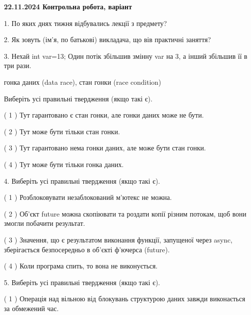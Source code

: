 \documentclass[12pt, ukrainian]{article}
\begin{document}
\vspace{4mm}
\newpage
\begin {large}

\textbf{22.11.2024 Контрольна робота, варіант  }\par


{
1. По яких днях тижня відбувались лекції з предмету?



\vspace{5mm}
2. Як зовуть (ім'я, по батькові) викладача, що вів практичні заняття?



\vspace{5mm}
3. Нехай int var=13; Один потік збільшив змінну var на 3, а інший збільшив її в три рази.

гонка даних (data race), стан гонки (race condition)

Виберіть усі правильні твердження (якщо такі є).\par
\vspace{2mm}
( 1 ) Тут гарантовано є стан гонки, але гонки даних може не бути.%

( 2 ) Тут може бути тільки стан гонки.%

( 3 ) Тут гарантовано нема гонки даних, але може бути стан гонки.%

( 4 ) Тут може бути тільки гонка даних.%


\vspace{5mm}
4. Виберіть усі правильні твердження (якщо такі є).\par
\vspace{2mm}

( 1 ) Розблоковувати незаблокований м’ютекс не можна.%

( 2 ) Об’єкт future можна скопіювати та роздати копії різним потокам, щоб вони змогли побачити результат.%

( 3 ) Значення, що є результатом виконання функції, запущеної через async, зберігається безпосередньо в об’єкті ф’ючерса (future).%

( 4 ) Коли програма спить, то вона не виконується.%


\vspace{5mm}
5. Виберіть усі правильні твердження (якщо такі є).\par
\vspace{2mm}

( 1 ) Операція над вільною від блокувань структурою даних завжди виконається за обмежений час.%

}
\end{large}
\end{document}
